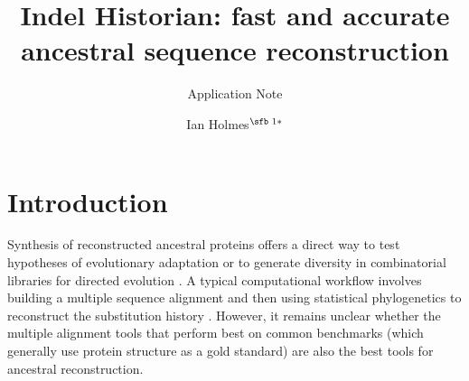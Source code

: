 \documentclass{bioinfo}
\begin{document}

\subtitle{Application Note}

\title[Indel Historian: phylogenetic ancestral reconstruction]{Indel Historian: fast and accurate ancestral sequence reconstruction}
\author[Ian Holmes]{Ian Holmes$^{\text{\sfb 1}*}$}
\address{$^{\text{\sf 1}}$Department of Bioengineering, University of California, Berkeley, 94703, USA.}





\maketitle

\section{Introduction}

Synthesis of reconstructed ancestral proteins offers a direct way to test hypotheses of evolutionary adaptation \citep{UgaldeEtAl2004,OrtlundEtAl2007,GaucherEtAl2008}
or to generate diversity in combinatorial libraries for directed evolution \citep{AlcolombriEtAl2011,SantiagoOrtizEtAl2015}.
A typical computational workflow involves building a multiple sequence alignment and then using statistical phylogenetics to reconstruct the substitution history
\citep{Liberles2007}.
However, it remains unclear whether the multiple alignment tools that perform best on common benchmarks
(which generally use protein structure as a gold standard)
are also the best tools for ancestral reconstruction.
\end{document}
